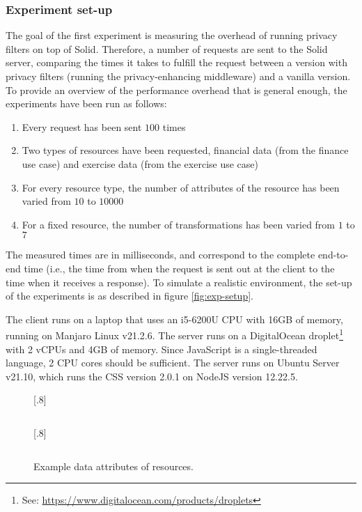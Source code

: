 \subsubsection{Experiment set-up}
The goal of the first experiment is measuring the overhead of running privacy filters on top of Solid. Therefore, a number of requests are sent to the Solid server, comparing the times it takes to fulfill the request between a version with privacy filters (running the privacy-enhancing middleware) and a vanilla version. To provide an overview of the performance overhead that is general enough, the experiments have been run as follows:
\begin{enumerate}
    \item Every request has been sent $100$ times
    \item Two types of resources have been requested, financial data (from the finance use case) and exercise data (from the exercise use case)
    \item For every resource type, the number of attributes of the resource has been varied from $10$ to $10 000$
    \item For a fixed resource, the number of transformations has been varied from $1$ to $7$
\end{enumerate}

\noindent The measured times are in milliseconds, and correspond to the complete end-to-end time (i.e., the time from when the request is sent out at the client to the time when it receives a response). To simulate a realistic environment, the set-up of the experiments is as described in figure \ref{fig:exp-setup}.

\noindent 

\noindent The client runs on a laptop that uses an i5-6200U CPU with 16GB of memory, running on Manjaro Linux v21.2.6. The server runs on a DigitalOcean droplet\footnote{See: \url{https://www.digitalocean.com/products/droplets}} with 2 vCPUs and 4GB of memory. Since JavaScript is a single-threaded language, 2 CPU cores should be sufficient. The server runs on Ubuntu Server v21.10, which runs the \acrlong{CSS} version 2.0.1 on NodeJS version 12.22.5.

\begin{figure}[H]
\centering
{}%
  [.8\textwidth]{\inputminted[linenos,tabsize=2,breaklines]{json}{code/ex-attr-txdata.json}}
  [.8\textwidth]{ \inputminted[linenos,tabsize=2]{xml}{code/ex-attr-tcx.xml}}
\caption{Example data attributes of resources.}
\label{fig:example-attributes}
\end{figure}

